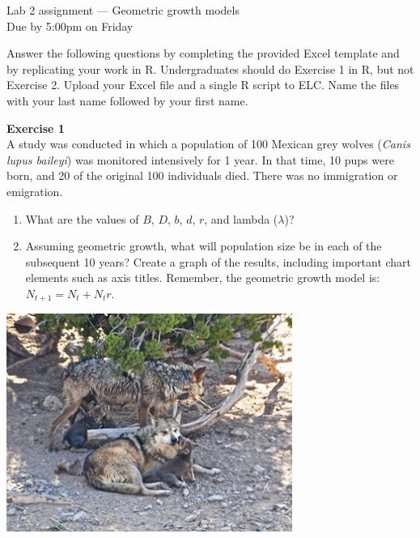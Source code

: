 \documentclass[12pt]{article}\usepackage[]{graphicx}\usepackage[]{xcolor}
\begin{document}
{
  \Large
  \centering
  Lab 2 assignment --- Geometric growth models \\
  Due by 5:00pm on Friday \par
}

Answer the following questions by completing the provided Excel 
template and by replicating your work in R. Undergraduates should do
Exercise 1 in R, but not Exercise 2. Upload your Excel file and a
single R script to ELC. Name the files with your last
name followed by your first name. \\ 

\vspace{12pt}

{\bf Exercise 1 \\}
A study was conducted in which a population of 100 Mexican grey wolves
({\it Canis lupus baileyi}) was monitored intensively for 1 year. In
that time, 10 pups were born, and 20 of the original 100 individuals 
died. There was no immigration or emigration.  

\begin{enumerate}
  \item What are the values of $B$, $D$, $b$, $d$, $r$, and lambda
    ($\lambda$)?
  \item Assuming geometric growth, what will population size be in
    each of the subsequent 10 years? Create a graph of the results,
    including important chart elements such as axis titles. Remember,
    the geometric growth model is: $N_{t+1} = N_t + N_t r$.
\end{enumerate}

\vspace{24pt}

{
  \centering
  \includegraphics[width=0.7\textwidth]{figs/Coronadopack2} \\
}


\clearpage
\end{document}
